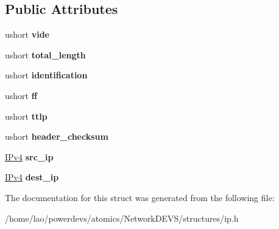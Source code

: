 \subsection*{Public Attributes}
\begin{DoxyCompactItemize}
\item 
ushort {\bfseries vide}\hypertarget{structip_1_1Header_a105b752c949ecc83a6c64dec53b51e96}{}\label{structip_1_1Header_a105b752c949ecc83a6c64dec53b51e96}

\item 
ushort {\bfseries total\+\_\+length}\hypertarget{structip_1_1Header_ae3ae0942baa2544afa8b86b9677ce464}{}\label{structip_1_1Header_ae3ae0942baa2544afa8b86b9677ce464}

\item 
ushort {\bfseries identification}\hypertarget{structip_1_1Header_a6a1db0df8e25a4bcc0f2df9549bc30b1}{}\label{structip_1_1Header_a6a1db0df8e25a4bcc0f2df9549bc30b1}

\item 
ushort {\bfseries ff}\hypertarget{structip_1_1Header_a9c79b047f8384c0e78055dda3271598f}{}\label{structip_1_1Header_a9c79b047f8384c0e78055dda3271598f}

\item 
ushort {\bfseries ttlp}\hypertarget{structip_1_1Header_ad747dde10ed8db84dd6eec3e5e6e4619}{}\label{structip_1_1Header_ad747dde10ed8db84dd6eec3e5e6e4619}

\item 
ushort {\bfseries header\+\_\+checksum}\hypertarget{structip_1_1Header_a9c970e995fa43b87ed6be2a7e3b7e179}{}\label{structip_1_1Header_a9c970e995fa43b87ed6be2a7e3b7e179}

\item 
\hyperlink{structIPv4}{I\+Pv4} {\bfseries src\+\_\+ip}\hypertarget{structip_1_1Header_a0da2fcac6244ddb22e31efb81e3571a9}{}\label{structip_1_1Header_a0da2fcac6244ddb22e31efb81e3571a9}

\item 
\hyperlink{structIPv4}{I\+Pv4} {\bfseries dest\+\_\+ip}\hypertarget{structip_1_1Header_a3609ecc70b34815e28ef2f46708fe7ee}{}\label{structip_1_1Header_a3609ecc70b34815e28ef2f46708fe7ee}

\end{DoxyCompactItemize}


The documentation for this struct was generated from the following file\+:\begin{DoxyCompactItemize}
\item 
/home/lao/powerdevs/atomics/\+Network\+D\+E\+V\+S/structures/ip.\+h\end{DoxyCompactItemize}
